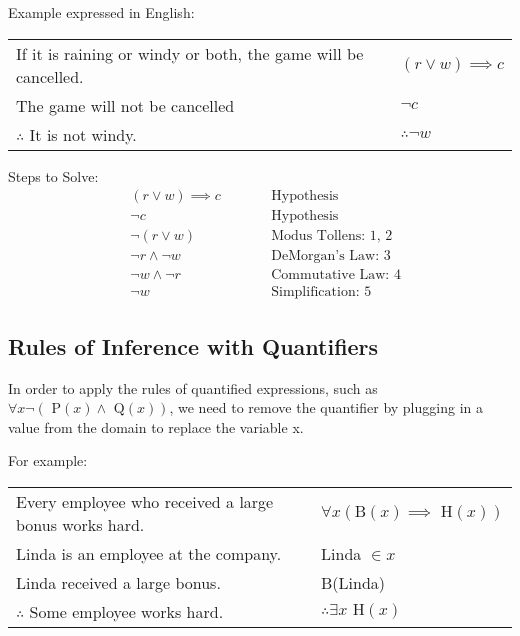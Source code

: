 Example expressed in English:
\begin{center}
  \begin{tabular}{lrl}
    If it is raining or windy or both, the game will be cancelled. &  & $(r \lor w) \implies c$ \\
    The game will not be cancelled                                 &  & $\lnot c$               \\
    \hhline{-~-}
    $\therefore$ It is not windy.                                  &  & $\therefore \lnot w$
  \end{tabular}

  Steps to Solve:
  \begin{align}
     & (r \lor w) \implies c &  & \qquad \text{Hypothesis}          \\
     & \lnot c               &  & \qquad \text{Hypothesis}          \\
     & \lnot (r \lor w)      &  & \qquad \text{Modus Tollens: 1, 2} \\
     & \lnot r \land \lnot w &  & \qquad \text{DeMorgan's Law: 3}   \\
     & \lnot w \land \lnot r &  & \qquad \text{Commutative Law: 4}  \\
     & \lnot w               &  & \qquad \text{Simplification: 5}
  \end{align}
\end{center}

\subsection{Rules of Inference with Quantifiers}

In order to apply the rules of quantified expressions, such as $\forall x \lnot (\text{ P}(x) \land \text{ Q}(x))$,
we need to remove the quantifier by plugging in a value from the domain to replace the variable x.

For example:
\begin{center}
  \begin{tabular}{lrl}
    Every employee who received a large bonus works hard. &  & $\forall x (\text{B}(x) \implies \text{ H}(x))$ \\
    Linda is an employee at the company.                  &  & Linda $\in x$                                   \\
    Linda received a large bonus.                         &  & B(Linda)                                        \\
    \hhline{-~-}
    $\therefore$ Some employee works hard.                &  & $\therefore \exists x \text{ H}(x)$
  \end{tabular}
\end{center}


